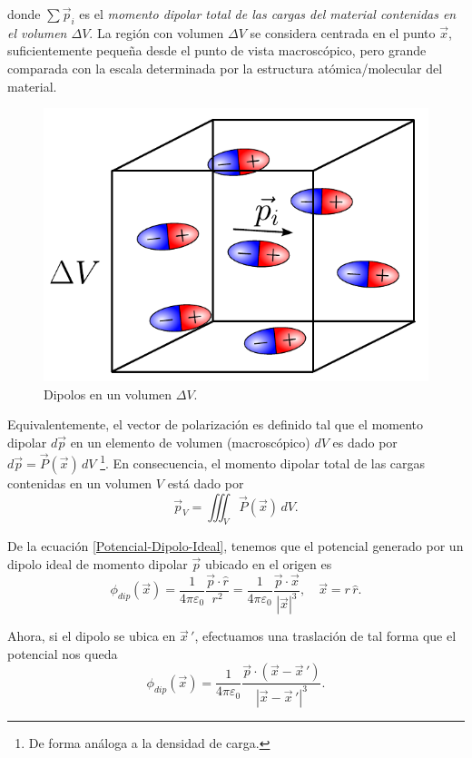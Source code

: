 donde $\sum\Vec{p}_i$ es el \textit{momento dipolar total de las cargas del material contenidas en el volumen $\Delta V$}. La región con volumen $\Delta V$ se considera centrada en el punto $\Vec{x}$, suficientemente pequeña desde el punto de vista macroscópico, pero grande comparada con la escala determinada por la estructura atómica/molecular del material. 

 \begin{figure}[H]
     \centering
     \includegraphics[scale = 0.6]{Figuras/Polarizacion.pdf}
     \caption{Dipolos en un volumen $\Delta V$.}
     \label{fig:Polarizacion-Volumen}
 \end{figure}

Equivalentemente, el vector de polarización es definido tal que el momento dipolar $d\Vec{p}$ en un elemento de volumen (macroscópico) $dV$ es dado por $d\Vec{p} = \Vec{P}(\Vec{x})\,dV$ \footnote{De forma análoga a la densidad de carga.}. En consecuencia, el momento dipolar total de las cargas contenidas en un volumen $V$ está dado por
$$\Vec{p}_V = \iiint_V \Vec{P}(\Vec{x}) \,dV.$$ 

De la ecuación \eqref{Potencial-Dipolo-Ideal}, tenemos que el potencial generado por un dipolo ideal de momento dipolar $\Vec{p}$ ubicado en el origen es 
$$\phi_{dip}(\Vec{x}) = \frac{1}{4\pi \varepsilon_0} \frac{\Vec{p} \cdot \hat{r}}{r^2} = \frac{1}{4\pi \varepsilon_0} \frac{\Vec{p} \cdot \Vec{x}}{|\Vec{x}|^3},\quad \Vec{x} = r\,\hat{r}.$$

Ahora, si el dipolo se ubica en $\Vec{x}\,'$, efectuamos una traslación de tal forma que el potencial nos queda
$$\phi_{dip}(\Vec{x}) = \frac{1}{4\pi \varepsilon_0} \frac{\Vec{p} \cdot (\Vec{x} - \Vec{x}\,')}{|\Vec{x} - \Vec{x}\,'|^3}.$$

